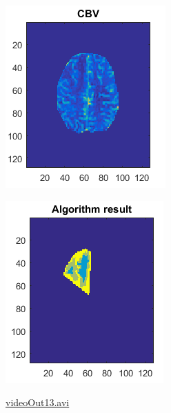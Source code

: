 \documentclass{beamer}
\begin{document}
\begin{frame}
\centering
\includegraphics[scale=0.80]{Patient2Result-CBV.png}

\end{frame}

\begin{frame}
\centering
\includegraphics[scale=0.80]{Patient2Result-ALGO.png}

\end{frame}


\begin{frame}

\url{videoOut13.avi}

\end{frame}
\end{document}
